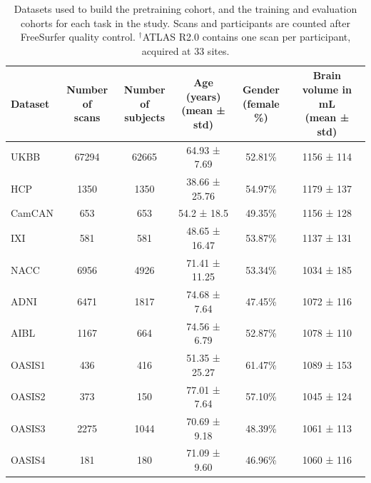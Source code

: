 \documentclass[pdflatex,sn-nature]{sn-jnl}%
\newif\ifhighlight
\newcommand{\rev}[1]{\ifhighlight{\color{blue}{}#1}\else#1\fi}%
\theoremstyle{thmstyleone}%
\theoremstyle{thmstyletwo}%
\theoremstyle{thmstylethree}%
\begin{document}

\begin{table}[t]
\caption{Datasets used to build the pretraining cohort, and the training and evaluation cohorts for each task in the study.\rev{ Scans and participants are counted after FreeSurfer quality control. $^{\dagger}$ATLAS R2.0 contains one scan per participant, acquired at 33 sites.}}
\label{tab:datasets}
\centering
\begin{tabular}{l|c|c|c|c|c}
\hline
\textbf{Dataset} & \makecell{Number of\\ scans} & \makecell{Number of\\ subjects} & \makecell{Age (years)\\ (mean ± std)}  & \makecell{Gender\\ (female \%)} & \makecell{Brain volume in mL\\ (mean ± std)} \\ \hline
UKBB & 67294 & 62665 & 64.93 ± 7.69 & 52.81\% & 1156 ± 114 \\ 
HCP & 1350 & 1350 & 38.66 ± 25.76 & 54.97\% & 1179 ± 137 \\ 
CamCAN & 653 & 653 & 54.2 ± 18.5  & 49.35\% & 1156 ± 128 \\ 
IXI & 581 & 581 & 48.65 ± 16.47 & 53.87\% & 1137 ± 131 \\ \hline
NACC & 6956 & 4926 & 71.41 ± 11.25 & 53.34\% & 1034 ± 185 \\ 
ADNI & 6471 & 1817 & 74.68 ± 7.64 & 47.45\% & 1072 ± 116 \\ 
AIBL & 1167 & 664 & 74.56 ± 6.79 & 52.87\% & 1078 ± 110 \\ 
OASIS1 & 436 & 416 & 51.35 ± 25.27 & 61.47\% & 1089 ± 153 \\ 
OASIS2 & 373 & 150 & 77.01 ± 7.64 & 57.10\% & 1045 ± 124 \\ 
OASIS3 & 2275 & 1044 & 70.69 ± 9.18 & 48.39\% & 1061 ± 113 \\ 
OASIS4 & 181 & 180 & 71.09 ± 9.60 & 46.96\% & 1060 ± 116 \\ 

\end{tabular}
\end{table}
\end{document}
